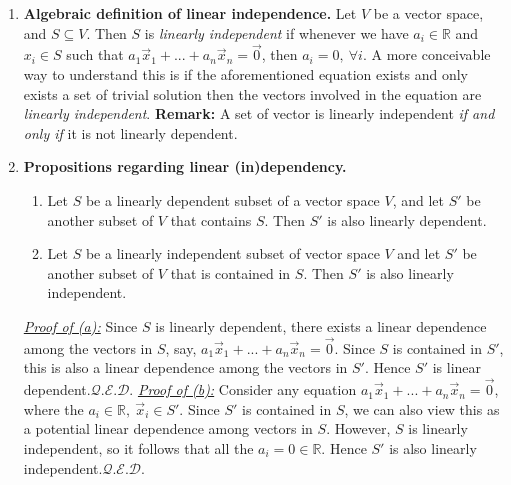 \documentclass[oneside, 12pt]{book}
\newcommand{\settag}[1]{\renewcommand{\theenumi}{#1}}
\newcommand{\R}{\mathbb{R}}
\newcommand{\qed}{\hfill $\mathcal{Q}.\mathcal{E}.\mathcal{D}.$}
\newcommand{\tbf}[1]{\textbf{#1}}
\newcommand{\tit}[1]{\textit{#1}}
\begin{document}
\begin{enumerate}
        \settag{1.4.4}
        \item \textbf{Algebraic definition of linear independence.} Let $V$ be a vector space, and $S\subseteq V$. Then $S$ is \textit{linearly independent} if whenever we have $a_i\in \R$ and $x_i\in S$ such that $a_1\vec{x}_1+...+a_n\vec{x}_n = \vec{0}$, then $a_i = 0,~\forall i$. A more conceivable way to understand this is if the aforementioned equation exists and only exists a set of trivial solution then the vectors involved in the equation are \textit{linearly independent}. \newline \tbf{Remark: }A set of vector is linearly independent \tit{if and only if} it is not linearly dependent.
        
        \settag{1.4.7}
        \item \textbf{Propositions regarding linear (in)dependency.}
            \begin{enumerate}
                \item Let $S$ be a linearly dependent subset of a vector space $V$, and let $S'$ be another subset of $V$ that contains $S$. Then $S'$ is also linearly dependent.
                \item Let $S$ be a linearly independent subset of vector space $V$ and let $S'$ be another subset of $V$ that is contained in $S$. Then $S'$ is also linearly independent.
            \end{enumerate}
        \underline{\tit{Proof of (a):}}
        Since $S$ is linearly dependent, there exists a linear dependence among the vectors in $S$, say, $a_1\vec{x}_1 + ...+ a_n\vec{x}_n = \vec{0}$. Since $S$ is contained in $S'$, this is also a linear dependence among the vectors in $S'$. Hence $S'$ is linear dependent.\qed\newline
        \underline{\tit{Proof of (b):}}
        Consider any equation $a_1\vec{x}_1 + ...+ a_n\vec{x}_n = \vec{0}$, where the $a_i \in \R,~\vec{x}_i \in S'$. Since $S'$ is contained in $S$, we can also view this as a potential linear dependence among vectors in $S$. However, $S$ is linearly independent, so it follows that all the $a_i = 0\in \R$. Hence $S'$ is also linearly independent.\qed
        

\end{enumerate}
\end{document}
